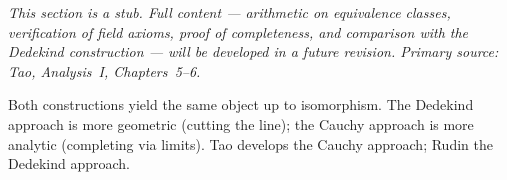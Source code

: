 \begin{remark*}[Status]
\textit{This section is a stub. Full content — arithmetic on equivalence classes,
verification of field axioms, proof of completeness, and comparison with the
Dedekind construction — will be developed in a future revision.
Primary source: Tao, \textit{Analysis~I}, Chapters~5--6.}
\end{remark*}

\begin{remark*}
Both constructions yield the same object up to isomorphism.
The Dedekind approach is more geometric (cutting the line);
the Cauchy approach is more analytic (completing via limits).
Tao develops the Cauchy approach; Rudin the Dedekind approach.
\end{remark*}
